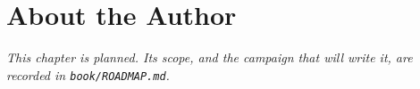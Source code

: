 \chapter{About the Author}
\label{ch:author}

\emph{This chapter is planned. Its scope, and the campaign that will write
it, are recorded in \texttt{book/ROADMAP.md}.}

